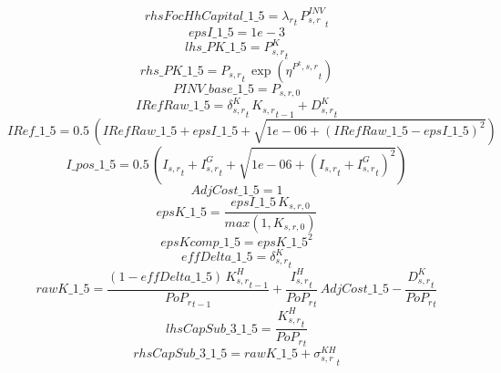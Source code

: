 \begin{dmath*}
rhsFocHhCapital\_1\_5 = {\lambda_r}_{t}\, {{P^{INV}_{s,r}}}_{t}
\end{dmath*}
\begin{dmath*}
epsI\_1\_5 = 1e-3
\end{dmath*}
\begin{dmath*}
lhs\_PK\_1\_5 = {{P^K_{s,r}}}_{t}
\end{dmath*}
\begin{dmath*}
rhs\_PK\_1\_5 = {{P_{s,r}}}_{t}\, \exp\left({{\eta^{P^k,s,r}}}_{t}\right)
\end{dmath*}
\begin{dmath*}
PINV\_base\_1\_5 = {{P_{s,r,0}}}
\end{dmath*}
\begin{dmath*}
IRefRaw\_1\_5 = {{\delta^{K}_{s,r}}}_{t}\, {{K_{s,r}}}_{t-1}+{{D^K_{s,r}}}_{t}
\end{dmath*}
\begin{dmath*}
IRef\_1\_5 = 0.5\, \left({IRefRaw\_1\_5}+{epsI\_1\_5}+\sqrt{1e-06+\left({IRefRaw\_1\_5}-{epsI\_1\_5}\right)^{2}}\right)
\end{dmath*}
\begin{dmath*}
I\_pos\_1\_5 = 0.5\, \left({{I_{s,r}}}_{t}+{{I^G_{s,r}}}_{t}+\sqrt{1e-06+\left({{I_{s,r}}}_{t}+{{I^G_{s,r}}}_{t}\right)^{2}}\right)
\end{dmath*}
\begin{dmath*}
AdjCost\_1\_5 = 1
\end{dmath*}
\begin{dmath*}
epsK\_1\_5 = \frac{{epsI\_1\_5}\, {{K_{s,r,0}}}}{max(1,{{K_{s,r,0}}})}
\end{dmath*}
\begin{dmath*}
epsKcomp\_1\_5 = {epsK\_1\_5}^{2}
\end{dmath*}
\begin{dmath*}
effDelta\_1\_5 = {{\delta^{K}_{s,r}}}_{t}
\end{dmath*}
\begin{dmath*}
rawK\_1\_5 = \frac{\left(1-{effDelta\_1\_5}\right)\, {{K^H_{s,r}}}_{t-1}}{{{PoP_r}}_{t-1}}+\frac{{{I^H_{s,r}}}_{t}}{{{PoP_r}}_{t}}\, {AdjCost\_1\_5}-\frac{{{D^K_{s,r}}}_{t}}{{{PoP_r}}_{t}}
\end{dmath*}
\begin{dmath*}
lhsCapSub\_3\_1\_5 = \frac{{{K^H_{s,r}}}_{t}}{{{PoP_r}}_{t}}
\end{dmath*}
\begin{dmath*}
rhsCapSub\_3\_1\_5 = {rawK\_1\_5}+{{\sigma^{KH}_{s,r}}}_{t}
\end{dmath*}
